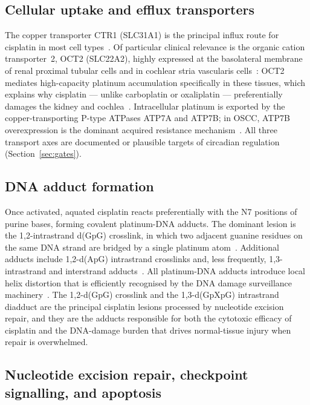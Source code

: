 \documentclass[preprint,review,12pt]{elsarticle}
\begin{document}
\subsection{Cellular uptake and efflux transporters}

The copper transporter CTR1 (SLC31A1) is the principal influx route for
cisplatin in most cell types~\cite{Yoshizawa2007}. Of particular clinical
relevance is the organic cation transporter~2, OCT2 (SLC22A2), highly
expressed at the basolateral membrane of renal proximal tubular cells
and in cochlear stria vascularis cells~\cite{Pabla2008}: OCT2 mediates
high-capacity platinum accumulation specifically in these tissues, which
explains why cisplatin --- unlike carboplatin or oxaliplatin --- preferentially
damages the kidney and cochlea~\cite{Pabla2008, Karasawa2015}. Intracellular
platinum is exported by the copper-transporting P-type ATPases ATP7A and
ATP7B; in OSCC, ATP7B overexpression is the dominant acquired resistance
mechanism~\cite{Yoshizawa2007}. All three transport axes are documented
or plausible targets of circadian regulation (Section~\ref{sec:gates}).

\subsection{DNA adduct formation}

Once activated, aquated cisplatin reacts preferentially with the N7 positions
of purine bases, forming covalent platinum-DNA adducts. The dominant lesion
is the 1,2-intrastrand d(GpG) crosslink, in which two adjacent guanine
residues on the same DNA strand are bridged by a single platinum
atom~\cite{JamiesonLippard1999}. Additional
adducts include 1,2-d(ApG) intrastrand crosslinks and, less frequently,
1,3-intrastrand and interstrand adducts~\cite{JamiesonLippard1999}.
All platinum-DNA adducts introduce local helix distortion that is efficiently
recognised by the DNA damage surveillance machinery~\cite{Kang2009}. The
1,2-d(GpG) crosslink and the 1,3-d(GpXpG) intrastrand diadduct are the
principal cisplatin lesions processed by nucleotide excision repair, and they
are the adducts responsible for both the cytotoxic efficacy of cisplatin
and the DNA-damage burden that drives normal-tissue injury when repair is
overwhelmed.

\subsection{Nucleotide excision repair, checkpoint signalling, and apoptosis}
\end{document}
